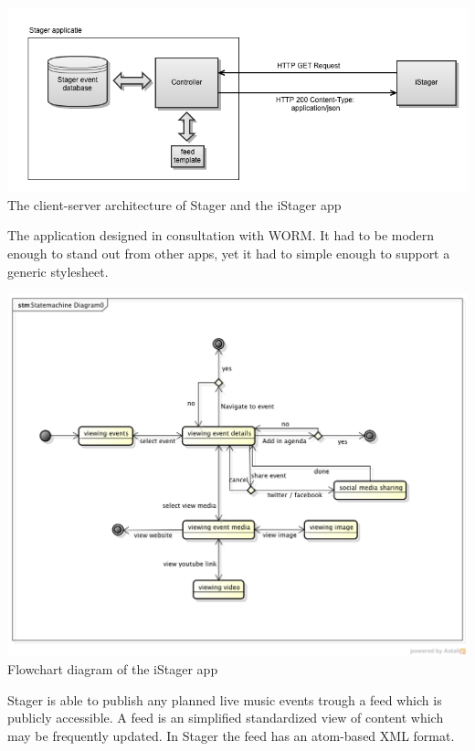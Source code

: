 \begin{centering}
	\includegraphics[scale=0.4]{images/globale_architectuur.png}\\{The client-server architecture of Stager and the iStager app}\\
\end{centering}

The application designed in consultation with WORM. It had to be modern enough to stand out from other apps, yet it had to simple enough to support a generic stylesheet.


\begin{centering}
	\includegraphics[scale=0.4]{images/stagerapp_statediagram.png}\\{Flowchart diagram of the iStager app}\\
\end{centering}


Stager is able to publish any planned live music events trough a feed which is publicly accessible. A feed is an simplified standardized view of content which may be frequently updated. In Stager the feed has an atom-based XML format.

